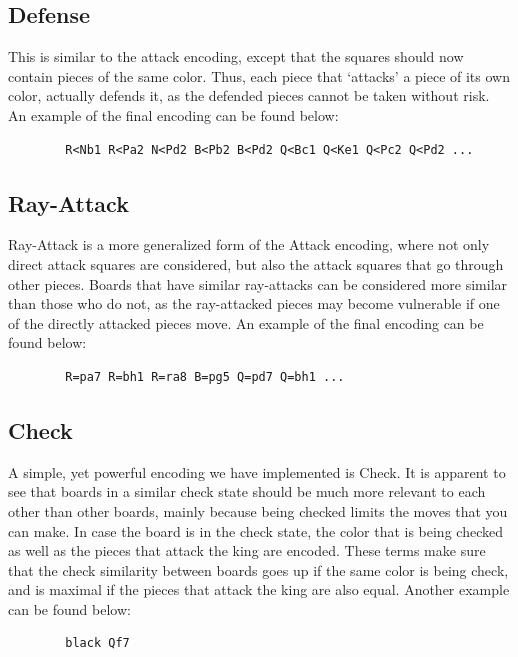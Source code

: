 \documentclass[11pt]{article}
\begin{document}
    \subsection{Defense}

    This is similar to the attack encoding, except that the squares should now contain pieces of the same color. Thus, each piece that `attacks' a piece of its own color, actually defends it, as the defended pieces cannot be taken without risk. An example of the final encoding can be found below:

    \begin{verbatim}
        R<Nb1 R<Pa2 N<Pd2 B<Pb2 B<Pd2 Q<Bc1 Q<Ke1 Q<Pc2 Q<Pd2 ...
    \end{verbatim}

    \subsection{Ray-Attack}

    Ray-Attack is a more generalized form of the Attack encoding, where not only direct attack squares are considered, but also the attack squares that go through other pieces. Boards that have similar ray-attacks can be considered more similar than those who do not, as the ray-attacked pieces may become vulnerable if one of the directly attacked pieces move. An example of the final encoding can be found below:

    \begin{verbatim}
        R=pa7 R=bh1 R=ra8 B=pg5 Q=pd7 Q=bh1 ...
    \end{verbatim}

    \subsection{Check}

    A simple, yet powerful encoding we have implemented is Check. It is apparent to see that boards in a similar check state should be much more relevant to each other than other boards, mainly because being checked limits the moves that you can make. In case the board is in the check state, the color that is being checked as well as the pieces that attack the king are encoded. These terms make sure that the check similarity between boards goes up if the same color is being check, and is maximal if the pieces that attack the king are also equal. Another example can be found below:

    \begin{verbatim}
        black Qf7
    \end{verbatim}
\end{document}
